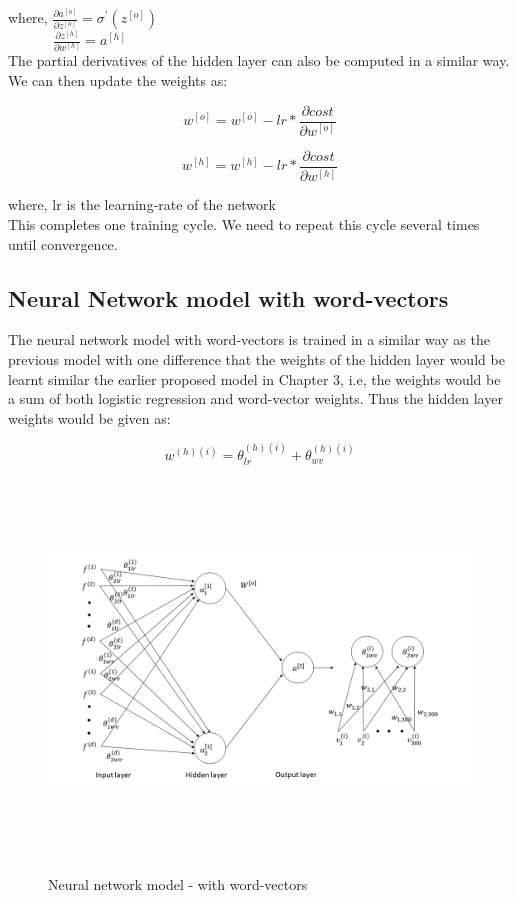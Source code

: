 where, $\frac{\partial a^{[o]}}{\partial z^{[o]}} =  \sigma^{'}(z^{[o]})$\\

$\quad\qquad\ \frac{\partial z^{[h]}}{\partial w^{[h]}} = a^{[h]}$ \\

The partial derivatives of the hidden layer can also be computed in a similar way. We can then update the weights as:

\begin{equation}
w^{[o]} = w^{[o]} - lr * \frac{\partial cost}{\partial w^{[o]}}
\end{equation}

\begin{equation}
w^{[h]} = w^{[h]} - lr * \frac{\partial cost}{\partial w^{[h]}}
\end{equation}

where, lr is the learning-rate of the network\\

This completes one training cycle. We need to repeat this cycle several times until convergence.

\newpage
\subsection{Neural Network model with word-vectors}

The neural network model with word-vectors is trained in a similar way as the previous model with one difference that the weights of the hidden layer would be learnt similar the earlier proposed model in Chapter 3, i.e, the weights would be a sum of both logistic regression and word-vector weights. Thus the hidden layer weights would be given as:

\begin{equation}
w^{(h)(i)} = \theta_{lr}^{(h)(i)} + \theta_{wv}^{(h)(i)}
\end{equation}

\begin{figure}[htbp]
\centering
\includegraphics[width=16cm, height=10cm]{images/proposed_method_nn.png}\\
\centering
\caption{Neural network model - with word-vectors}
\label{fig:foo}
\end{figure}

